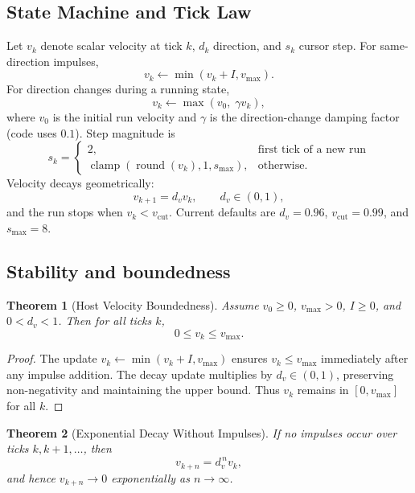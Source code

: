 \documentclass[journal]{IEEEtran}
\newtheorem{theorem}{Theorem}
\begin{document}
\subsection{State Machine and Tick Law}
Let \(v_k\) denote scalar velocity at tick \(k\), \(d_k\) direction, and \(s_k\) cursor step. For same-direction impulses,
\begin{equation}
v_k \leftarrow \min(v_k + I, v_{\max}).
\end{equation}
For direction changes during a running state,
\begin{equation}
v_k \leftarrow \max(v_0,\; \gamma v_k),
\end{equation}
where \(v_0\) is the initial run velocity and \(\gamma\) is the direction-change damping factor (code uses \(0.1\)). Step magnitude is
\begin{equation}
s_k =
\begin{cases}
2, & \text{first tick of a new run} \\
\operatorname{clamp}(\operatorname{round}(v_k), 1, s_{\max}), & \text{otherwise}.
\end{cases}
\end{equation}
Velocity decays geometrically:
\begin{equation}
v_{k+1}=d_v v_k,\qquad d_v \in (0,1),
\end{equation}
and the run stops when \(v_k < v_{\text{cut}}\). Current defaults are \(d_v=0.96\), \(v_{\text{cut}}=0.99\), and \(s_{\max}=8\).

\subsection{Stability and boundedness}

\begin{theorem}[Host Velocity Boundedness]
Assume \(v_0 \ge 0\), \(v_{\max} > 0\), \(I \ge 0\), and \(0<d_v<1\). Then for all ticks \(k\),
\[
0 \le v_k \le v_{\max}.
\]
\end{theorem}

\begin{proof}
The update \(v_k \leftarrow \min(v_k+I, v_{\max})\) ensures \(v_k \le v_{\max}\) immediately after any impulse addition. The decay update multiplies by \(d_v\in(0,1)\), preserving non-negativity and maintaining the upper bound. Thus \(v_k\) remains in \([0,v_{\max}]\) for all \(k\).
\end{proof}

\begin{theorem}[Exponential Decay Without Impulses]
If no impulses occur over ticks \(k,k+1,\dots\), then
\[
v_{k+n} = d_v^{\,n} v_k,
\]
and hence \(v_{k+n}\to 0\) exponentially as \(n\to\infty\).
\end{theorem}
\end{document}
